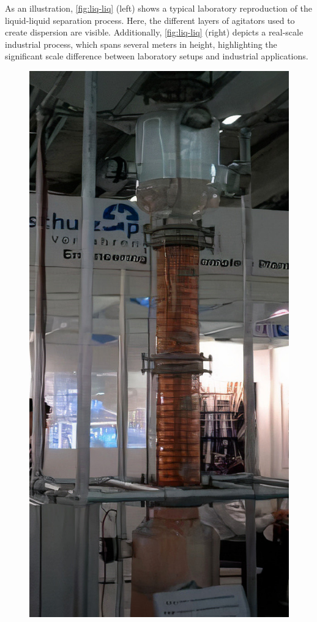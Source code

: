 As an illustration, \ref{fig:liq-liq} (left) shows a typical laboratory reproduction of the liquid-liquid separation process. 
Here, the different layers of agitators used to create dispersion are visible. 
Additionally, \ref{fig:liq-liq} (right) depicts a real-scale industrial process, which spans several meters in height, highlighting the significant scale difference between laboratory setups and industrial applications. 
\begin{figure}[h!]
    \centering
    \includegraphics[height=0.3\textheight]{image/liq-liq_LE_auto_x5.jpg}

\end{figure}

